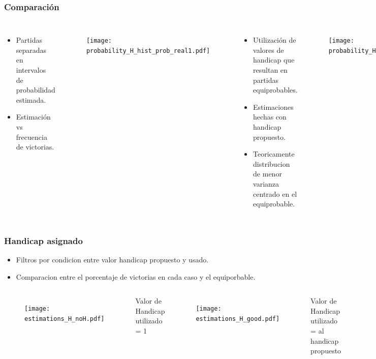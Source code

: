 \documentclass{beamer}
\begin{document}
\begin{frame}
\frametitle{Comparaci\'on}
\begin{columns}
     \begin{itemize}
        \item Partidas separadas en intervalos de probabilidad estimada.
        \item Estimaci\'on vs frecuencia de victorias.
    \end{itemize}
   \begin{figure}[H]
	\centering
	\texttt{[image: probability\_H\_hist\_prob\_real1.pdf]}
\end{figure}
 
     \begin{itemize}
        \item Utilizaci\'on de valores de handicap que resultan en partidas equiprobables.
        \item Estimaciones hechas con handicap propuesto.
        \item Teoricamente distribucion de menor varianza centrado en el equiprobable.
    \end{itemize}
  \begin{figure}[H]
	\centering
	\texttt{[image: probability\_H\_hist\_prob\_real2.pdf]}
\end{figure}
\end{columns}

\end{frame}


\begin{frame}
\frametitle{Handicap asignado}
     \begin{itemize}
     \vspace{-0.4cm}\item Filtros por condicion entre valor handicap propuesto y usado.
     \vspace{-0.4cm}\item Comparacion entre el porcentaje de victorias en cada caso y el equiporbable.
    \end{itemize}
\begin{columns}
 
   \begin{figure}[H]
	\centering
	\texttt{[image: estimations\_H\_noH.pdf]}
\end{figure}
 \begin{center}
   Valor de Handicap utilizado = 1
 \end{center}

  \begin{figure}[H]
	\centering
	\texttt{[image: estimations\_H\_good.pdf]}
\end{figure}
 \begin{center}
   Valor de Handicap utilizado = al handicap propuesto
 \end{center}
\end{columns}

\end{frame}
\end{document}
